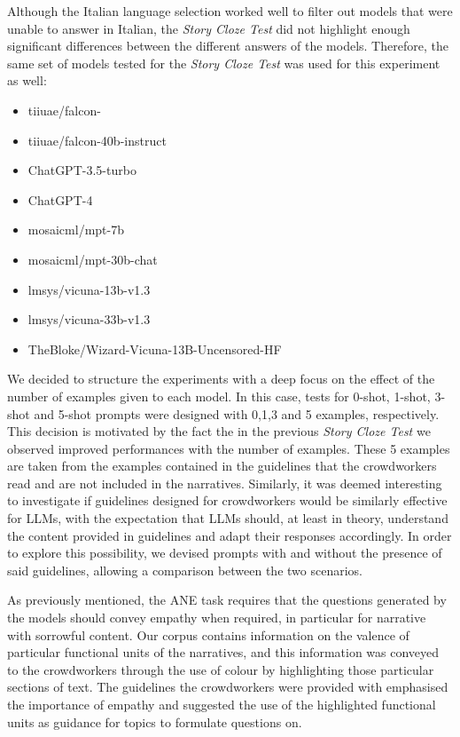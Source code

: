 Although the Italian language selection worked well to filter out models that were unable to answer in Italian, the \emph{Story Cloze Test} did not highlight enough significant differences between the different answers of the models.
Therefore, the same set of models tested for the \emph{Story Cloze Test} was used for this experiment as well:
\begin{itemize}
    \item   tiiuae/falcon- \cite{falcon40b}
    \item   tiiuae/falcon-40b-instruct \cite{falcon40b}
    \item   ChatGPT-3.5-turbo \cite{chatgpt}
    \item   ChatGPT-4 \cite{openai2023gpt4}
    \item   mosaicml/mpt-7b \cite{mpt7b}
    \item   mosaicml/mpt-30b-chat \cite{mpt30b}
    \item   lmsys/vicuna-13b-v1.3 \cite{touvronllama}
    \item   lmsys/vicuna-33b-v1.3 \cite{touvronllama}
    \item   TheBloke/Wizard-Vicuna-13B-Uncensored-HF \cite{wizard-vicuna}
\end{itemize}
We decided to structure the experiments with a deep focus on the effect of the number of examples given to each model. In this case, tests for 0-shot, 1-shot, 3-shot and 5-shot prompts were designed with 0,1,3 and 5 examples, respectively. This decision is motivated by the fact the in the previous \emph{Story Cloze Test} we observed improved performances with the number of examples. These 5 examples are taken from the examples contained in the guidelines that the crowdworkers read and are not included in the narratives. Similarly, it was deemed interesting to investigate if guidelines designed for crowdworkers would be similarly effective for LLMs, with the expectation that LLMs should, at least in theory, understand the content provided in guidelines and adapt their responses accordingly. In order to explore this possibility, we devised prompts with and without the presence of said guidelines, allowing a comparison between the two scenarios.

As previously mentioned, the ANE task 
requires that the questions generated by the models should convey empathy when required, in particular for narrative with sorrowful content. Our corpus contains information on the valence of particular functional units of the narratives, and this information was conveyed to the crowdworkers through the use of colour by highlighting those particular sections of text. The guidelines the crowdworkers were provided with emphasised the importance of empathy and suggested the use of the highlighted functional units as guidance for topics to formulate questions on. 


